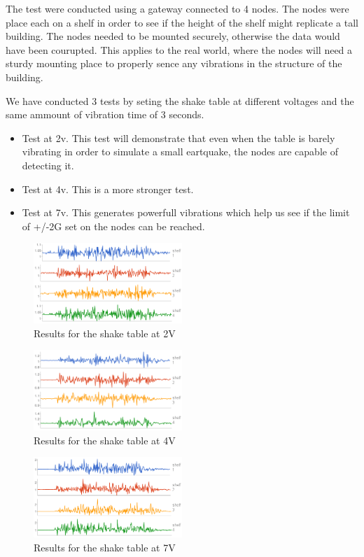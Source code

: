The test were conducted using a gateway connected to 4 nodes. The nodes were place each on a shelf in order to see if the height of the shelf might replicate a tall building. The nodes needed to be mounted securely, otherwise the data would have been courupted. This applies to the real world, where the nodes will need a sturdy mounting place to properly sence any vibrations in the structure of the building.


We have conducted 3 tests by seting the shake table at different voltages and the same ammount of vibration time of 3 seconds.
\begin{itemize}

\item Test at 2v. This test will demonstrate that even when the table is barely vibrating in order to simulate a small eartquake, the nodes are capable of detecting it.
\item Test at 4v. This is a more stronger test.
\item Test at 7v. This generates powerfull vibrations which help us see if the limit of +/-2G set on the nodes can be reached.
\end{itemize}

\begin{figure}[ht] \centering
  \includegraphics[width=0.5\textwidth]{img/2v.png}
  \caption{Results for the shake table at 2V}
  \label{fig:2v}
\end{figure}

\begin{figure}[ht] \centering
  \includegraphics[width=0.5\textwidth]{img/4v.png}
  \caption{Results for the shake table at 4V}
  \label{fig:4v}
\end{figure}

\begin{figure}[ht] \centering
  \includegraphics[width=0.5\textwidth]{img/7v.png}
  \caption{Results for the shake table at 7V}
  \label{fig:7v}
\end{figure}

